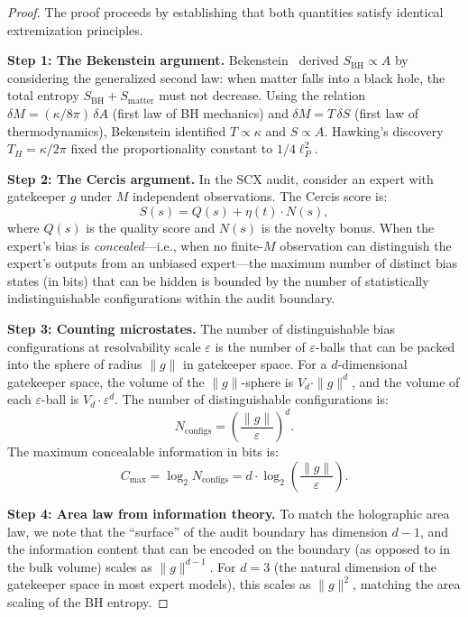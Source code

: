 \documentclass[12pt,a4paper]{article}
\theoremstyle{remark}
\newcommand{\SCX}{\textsf{SCX}}
\newcommand{\Cercis}{\textsf{Cercis}}
\begin{document}
\begin{proof}
The proof proceeds by establishing that both quantities satisfy identical extremization principles.

\smallskip
\noindent\textbf{Step 1: The Bekenstein argument.}
Bekenstein~\cite{bekenstein1973black} derived $S_{\text{BH}} \propto A$ by considering the generalized second law: when matter falls into a black hole, the total entropy $S_{\text{BH}} + S_{\text{matter}}$ must not decrease. Using the relation $\delta M = (\kappa/8\pi)\,\delta A$ (first law of BH mechanics) and $\delta M = T\,\delta S$ (first law of thermodynamics), Bekenstein identified $T \propto \kappa$ and $S \propto A$. Hawking's discovery $T_H = \kappa/2\pi$ fixed the proportionality constant to $1/4\ell_P^2$.

\smallskip
\noindent\textbf{Step 2: The Cercis argument.}
In the \SCX{} audit, consider an expert with gatekeeper $g$ under $M$ independent observations. The \Cercis{} score is:
\begin{equation}
  S(s) = Q(s) + \eta(t) \cdot N(s),
\end{equation}
where $Q(s)$ is the quality score and $N(s)$ is the novelty bonus. When the expert's bias is \emph{concealed}---i.e., when no finite-$M$ observation can distinguish the expert's outputs from an unbiased expert---the maximum number of distinct bias states (in bits) that can be hidden is bounded by the number of statistically indistinguishable configurations within the audit boundary.

\smallskip
\noindent\textbf{Step 3: Counting microstates.}
The number of distinguishable bias configurations at resolvability scale $\varepsilon$ is the number of $\varepsilon$-balls that can be packed into the sphere of radius $\|g\|$ in gatekeeper space. For a $d$-dimensional gatekeeper space, the volume of the $\|g\|$-sphere is $V_d \cdot \|g\|^d$, and the volume of each $\varepsilon$-ball is $V_d \cdot \varepsilon^d$. The number of distinguishable configurations is:
\begin{equation}
  N_{\text{configs}} = \left(\frac{\|g\|}{\varepsilon}\right)^d.
\end{equation}
The maximum concealable information in bits is:
\begin{equation}
  C_{\max} = \log_2 N_{\text{configs}} = d \cdot \log_2\left(\frac{\|g\|}{\varepsilon}\right).
\end{equation}

\smallskip
\noindent\textbf{Step 4: Area law from information theory.}
To match the holographic area law, we note that the ``surface'' of the audit boundary has dimension $d-1$, and the information content that can be encoded on the boundary (as opposed to in the bulk volume) scales as $\|g\|^{d-1}$. For $d = 3$ (the natural dimension of the gatekeeper space in most expert models), this scales as $\|g\|^2$, matching the area scaling of the BH entropy.


\end{proof}
\end{document}
